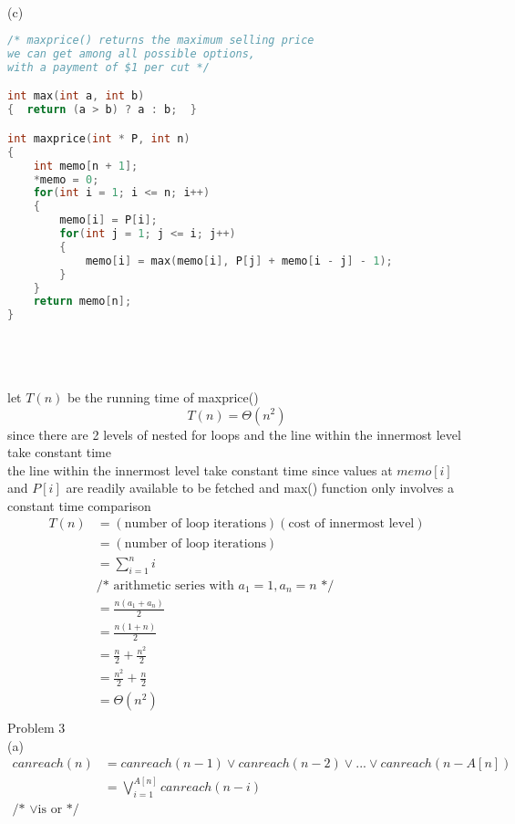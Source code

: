 \documentclass[12pt,border=4pt,multi]{article}%
\begin{document}
\\
(c)
\begin{lstlisting}[language = c]
/* maxprice() returns the maximum selling price
we can get among all possible options, 
with a payment of $1 per cut */

int max(int a, int b)
{  return (a > b) ? a : b;  }

int maxprice(int * P, int n)
{
    int memo[n + 1];
    *memo = 0; 
    for(int i = 1; i <= n; i++)
    {
        memo[i] = P[i];
        for(int j = 1; j <= i; j++)
        {
            memo[i] = max(memo[i], P[j] + memo[i - j] - 1);
        }
    }
    return memo[n];
}
\end{lstlisting}
\leavevmode
\\
\\
\\
let $T(n)$ be the running time of maxprice()
\[T(n) = \Theta(n^2)\]
since there are 2 levels of nested for loops and the line within the innermost level take constant time\\
the line within the innermost level take constant time since values at $memo[i]$ and $P[i]$ are readily available to be fetched and max() function only involves a constant time comparison\\
\begin{align*}
    T(n) &= (\text{number of loop iterations})(\text{cost of innermost level})\\
    &= (\text{number of loop iterations})\\
    &= \sum_{i = 1}^n i\\
    &\text{/* arithmetic series with } a_1 = 1, a_n = n \text{ */}\\
    &= \frac{n(a_1 + a_n)}{2}\\
    &= \frac{n(1 + n)}{2}\\
    &= \frac{n}{2} + \frac{n^2}{2}\\
    &= \frac{n^2}{2} + \frac{n}{2}\\
    &= \Theta(n^2)\\
\end{align*}
\newpage
\noindent
Problem 3\\
(a)
\begin{align*}
canreach(n) &= canreach(n - 1) \vee canreach(n - 2) \vee ... \vee canreach(n - A[n])\\
&= \bigvee_{i = 1}^{A[n]} canreach(n - i)\\
\text{/* } \vee \text{is or */}
\end{align*}
\\
\end{document}
